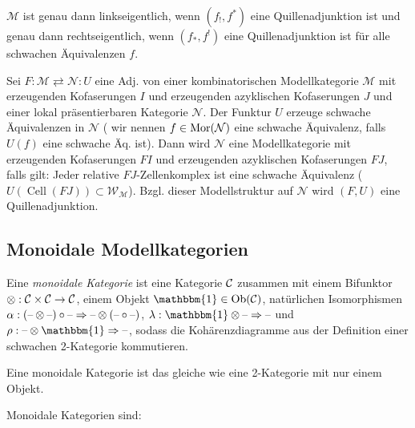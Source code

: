 \documentclass{cheat-sheet}
\newcommand{\Weak}{\mathcal{W}} %
\newcommand{\ModC}{\mathcal{M}} %
\newcommand{\NodC}{\mathcal{N}} %
\DeclareMathOperator{\Cell}{Cell} %
\newcommand{\LonelyHeart}{\{ \, \heartsuit \, \}} %
\newcommand{\UnitOb}{\mathbbm{1}} %
\begin{document}
\begin{prop}
  $\ModC$ ist genau dann linkseigentlich, wenn $(f_{!}, f^*)$ eine Quillenadjunktion ist und genau dann rechtseigentlich, wenn $(f_*, f^{!})$ eine Quillenadjunktion ist für alle schwachen Äquivalenzen $f$.
\end{prop}


\begin{satz}
  Sei $F : \ModC \rightleftarrows \NodC : U$ eine Adj. von einer kombinatorischen Modellkategorie $\ModC$ mit erzeugenden Kofaserungen $I$ und erzeugenden azyklischen Kofaserungen $J$ und einer lokal präsentierbaren Kategorie $\NodC$.
  Der Funktur $U$ erzeuge schwache Äquivalenzen in $\NodC$ (\dh{} wir nennen $f \in \Mor(\NodC)$ eine schwache Äquivalenz, falls $U(f)$ eine schwache Äq. ist).
  Dann wird $\NodC$ eine Modellkategorie mit erzeugenden Kofaserungen $FI$ und erzeugenden azyklischen Kofaserungen $FJ$, falls gilt:
  Jeder relative $FJ$-Zellenkomplex ist eine schwache Äquivalenz (\dh{} $U(\Cell(FJ)) \subset \Weak_\ModC$).
  Bzgl. dieser Modellstruktur auf $\NodC$ wird $(F, U)$ eine Quillenadjunktion.
\end{satz}

\subsection{Monoidale Modellkategorien}

\begin{defn}
  Eine \emph{monoidale Kategorie} ist eine Kategorie $\mathcal{C}$ zusammen mit einem Bifunktor $\otimes : \mathcal{C} \times \mathcal{C} \to \mathcal{C}$, einem Objekt $\UnitOb \in \Ob(\Cat)$, natürlichen Isomorphismen $\alpha : (\text{--} \otimes \text{--}) \circ \text{--} \Rightarrow \text{--} \otimes (\text{--} \circ \text{--})$, $\lambda : \UnitOb \otimes \blank \Rightarrow \blank$ und $\rho : \blank \otimes \UnitOb \Rightarrow \blank$, sodass die Kohärenzdiagramme aus der Definition einer schwachen 2-Kategorie kommutieren.
\end{defn}

\begin{bem}
  Eine monoidale Kategorie ist das gleiche wie eine 2-Kategorie mit nur einem Objekt.
\end{bem}

\begin{bspe}
  Monoidale Kategorien sind: \quad
  \inlineitem{$(\SetC, \times, \LonelyHeart)$} \\
\end{bspe}
\end{document}
